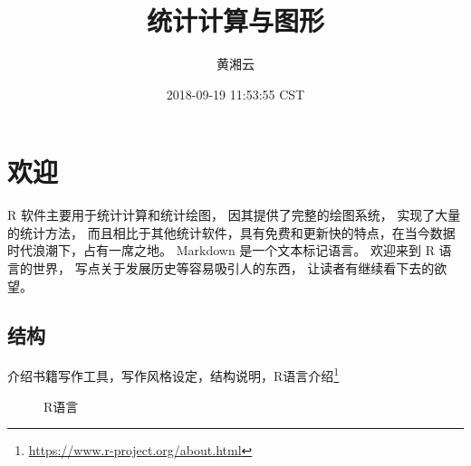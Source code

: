 \documentclass[a4paper,oneside,UTF8]{book}
\title{统计计算与图形}
\author{黄湘云}
\date{2018-09-19 11:53:55 CST}
\begin{document}
\maketitle

\thispagestyle{empty}
\setlength{\abovedisplayskip}{-5pt}
\setlength{\abovedisplayshortskip}{-5pt}

{
\setcounter{tocdepth}{1}
\tableofcontents
}
\hypertarget{welcome}{%
\chapter{欢迎}\label{welcome}}

R 软件主要用于统计计算和统计绘图， 因其提供了完整的绘图系统， 实现了大量的统计方法， 而且相比于其他统计软件，具有免费和更新快的特点，在当今数据时代浪潮下，占有一席之地。 Markdown  是一个文本标记语言。 欢迎来到 R 语言的世界， 写点关于发展历史等容易吸引人的东西， 让读者有继续看下去的欲望。

\hypertarget{structure}{%
\section*{结构}\label{structure}}

介绍书籍写作工具，写作风格设定，结构说明，R语言介绍\footnote{\url{https://www.r-project.org/about.html}}

\begin{figure}

{\centering {}

}

\caption{R语言}\label{fig:r-logo}
\end{figure}
\end{document}
